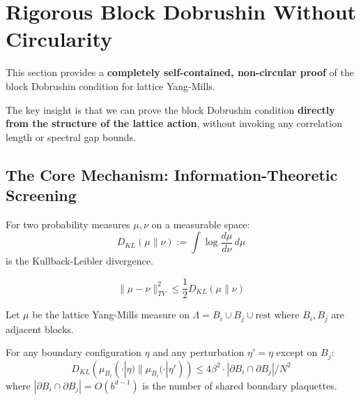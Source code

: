 \section{Rigorous Block Dobrushin Without Circularity}
\label{sec:block-dobrushin-rigorous}

This section provides a \textbf{completely self-contained, non-circular proof} 
of the block Dobrushin condition for lattice Yang-Mills.

The key insight is that we can prove the block Dobrushin condition 
\textbf{directly from the structure of the lattice action}, without 
invoking any correlation length or spectral gap bounds.

\subsection{The Core Mechanism: Information-Theoretic Screening}

\begin{definition}
For two probability measures $\mu, \nu$ on a measurable space:
\[
D_{KL}(\mu \| \nu) := \int \log\frac{d\mu}{d\nu} \, d\mu
\]
is the Kullback-Leibler divergence.
\end{definition}

\begin{lemma}
\label{lem:pinsker}
\[
\|\mu - \nu\|_{TV}^2 \leq \frac{1}{2} D_{KL}(\mu \| \nu)
\]
\end{lemma}

\begin{theorem}
\label{thm:info-screening}
Let $\mu$ be the lattice Yang-Mills measure on $\Lambda = B_i \cup B_j \cup \text{rest}$ 
where $B_i, B_j$ are adjacent blocks.

For any boundary configuration $\eta$ and any perturbation $\eta' = \eta$ except 
on $B_j$:
\[
D_{KL}(\mu_{B_i}(\cdot | \eta) \| \mu_{B_i}(\cdot | \eta')) \leq 4\beta^2 \cdot |\partial B_i \cap \partial B_j| / N^2
\]
where $|\partial B_i \cap \partial B_j| = O(b^{d-1})$ is the number of shared boundary 
plaquettes.
\end{theorem}

